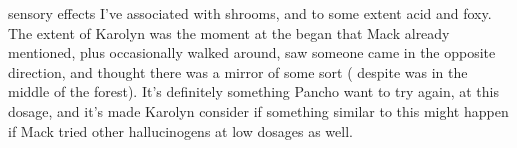 \documentclass[12pt]{book}
\begin{document}
sensory effects I've associated with shrooms, and to some extent acid and foxy. The extent of Karolyn was the moment at the began that Mack already mentioned, plus occasionally walked around, saw someone came in the opposite direction, and thought there was a mirror of some sort ( despite was in the middle of the forest). It's definitely something Pancho want to try again, at this dosage, and it's made Karolyn consider if something similar to this might happen if Mack tried other hallucinogens at low dosages as well.
\end{document}
